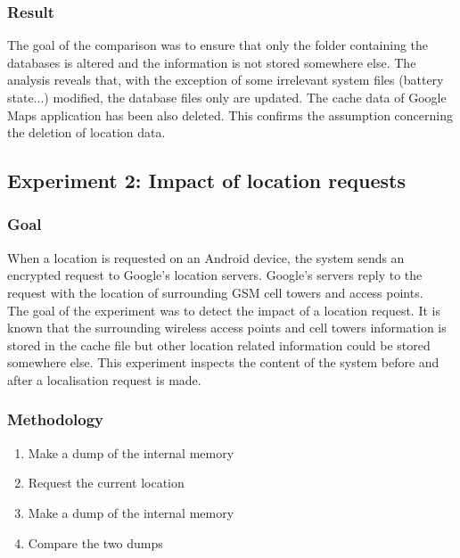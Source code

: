 \subsubsection{Result}

The goal of the comparison was to ensure that only the folder containing the databases is altered and the information is not stored somewhere else.
The analysis reveals that, with the exception of some irrelevant system files (battery state...) modified, the database files only are updated.
The cache data of Google Maps application has been also deleted.
This confirms the assumption concerning the deletion of location data.\\

\subsection{Experiment 2: Impact of location requests}

\subsubsection{Goal}

When a location is requested on an Android device, the system sends an encrypted request to Google's location servers.
Google's servers reply to the request with the location of surrounding GSM cell towers and access points.\\

The goal of the experiment was to detect the impact of a location request.
It is known that the surrounding wireless access points and cell towers information is stored in the cache file but other location related information could be stored somewhere else.
This experiment inspects the content of the system before and after a localisation request is made.


\subsubsection{Methodology}

\begin{enumerate}
\item Make a dump of the internal memory
\item Request the current location
\item Make a dump of the internal memory
\item Compare the two dumps
\end{enumerate}

